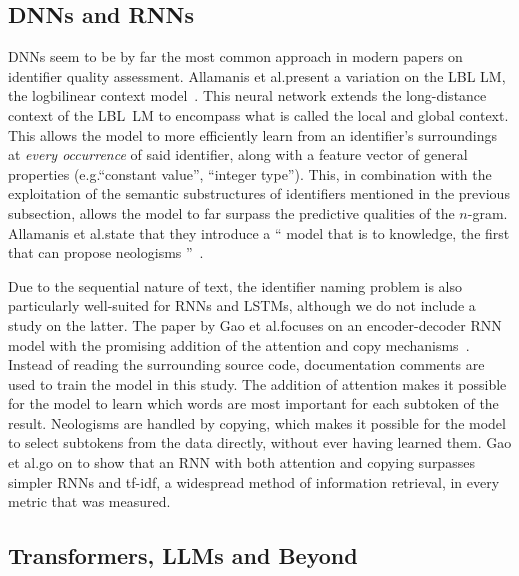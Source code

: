 \documentclass[conference]{IEEEtran}
\begin{document}

\subsection{\acsp{DNN} and \acp{RNN}}
\label{ssec:DNNs-RNNs-and-LSTMs}

\acp{DNN} seem to be by far the most common approach in modern papers on identifier
quality assessment. Allamanis et al.\@ present a variation on the \ac{LBL} \ac{LM}, the
logbilinear context model~\cite{Allamanis2015Suggesting}. This neural network extends the
long-distance context of the \ac{LBL}~\ac{LM} to encompass what is called the local and
global context. This allows the model to more efficiently learn from an identifier's
surroundings at \emph{every occurrence} of said identifier, along with a feature vector of
general properties (e.g.\@ \enquote{constant value}, \enquote{integer type}). This, in
combination with the exploitation of the semantic substructures of identifiers mentioned
in the previous subsection, allows the model to far surpass the predictive qualities of
the $n$-gram. Allamanis et al.\@ state that they introduce a \enquote{\textelp{} model
that is to  knowledge, the first that can propose neologisms
\textelp{}}~\cite{Allamanis2015Suggesting}.

Due to the sequential nature of text, the identifier naming problem is also particularly
well-suited for \acp{RNN} and \acp{LSTM}, although we do not include a study on the
latter. The paper by Gao et al.\@ focuses on an encoder-decoder \ac{RNN} model with the
promising addition of the attention and copy mechanisms~\cite{Gao2019IdentGen}. Instead of
reading the surrounding source code, documentation comments are used to train the model in
this study. The addition of attention makes it possible for the model to learn which words
are most important for each subtoken of the result. Neologisms are handled by copying,
which makes it possible for the model to select subtokens from the data directly, without
ever having learned them. Gao et al.\@ go on to show that an \ac{RNN} with both attention
and copying surpasses simpler \acp{RNN} and tf-idf, a widespread method of information
retrieval, in every metric that was measured.


\subsection{Transformers, \acp{LLM} and Beyond}
\label{ssec:LLMs-and-Beyond}
\end{document}
